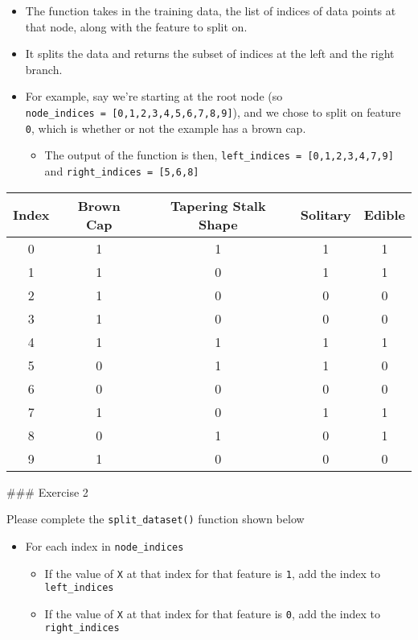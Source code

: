 \documentclass[11pt]{article}
\providecommand{\tightlist}{%
      \setlength{\itemsep}{0pt}\setlength{\parskip}{0pt}}
\begin{document}
\begin{itemize}
\tightlist
\item
  The function takes in the training data, the list of indices of data
  points at that node, along with the feature to split on.
\item
  It splits the data and returns the subset of indices at the left and
  the right branch.
\item
  For example, say we're starting at the root node (so
  \texttt{node\_indices\ =\ {[}0,1,2,3,4,5,6,7,8,9{]}}), and we chose to
  split on feature \texttt{0}, which is whether or not the example has a
  brown cap.

  \begin{itemize}
  \tightlist
  \item
    The output of the function is then,
    \texttt{left\_indices\ =\ {[}0,1,2,3,4,7,9{]}} and
    \texttt{right\_indices\ =\ {[}5,6,8{]}}
  \end{itemize}
\end{itemize}

\begin{longtable}[]{@{}ccccc@{}}
\toprule
Index & Brown Cap & Tapering Stalk Shape & Solitary &
Edible\tabularnewline
\midrule
\endhead
0 & 1 & 1 & 1 & 1\tabularnewline
1 & 1 & 0 & 1 & 1\tabularnewline
2 & 1 & 0 & 0 & 0\tabularnewline
3 & 1 & 0 & 0 & 0\tabularnewline
4 & 1 & 1 & 1 & 1\tabularnewline
5 & 0 & 1 & 1 & 0\tabularnewline
6 & 0 & 0 & 0 & 0\tabularnewline
7 & 1 & 0 & 1 & 1\tabularnewline
8 & 0 & 1 & 0 & 1\tabularnewline
9 & 1 & 0 & 0 & 0\tabularnewline
\bottomrule
\end{longtable}

\#\#\# Exercise 2

Please complete the \texttt{split\_dataset()} function shown below

\begin{itemize}
\tightlist
\item
  For each index in \texttt{node\_indices}

  \begin{itemize}
  \tightlist
  \item
    If the value of \texttt{X} at that index for that feature is
    \texttt{1}, add the index to \texttt{left\_indices}
  \item
    If the value of \texttt{X} at that index for that feature is
    \texttt{0}, add the index to \texttt{right\_indices}
  \end{itemize}
\end{itemize}
\end{document}
